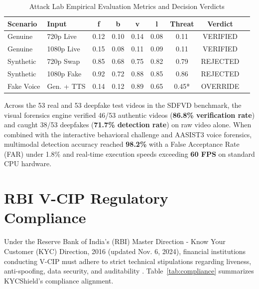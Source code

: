 \documentclass[conference]{IEEEtran}
\begin{document}
\begin{table}[h]
\centering
\caption{Attack Lab Empirical Evaluation Metrics and Decision Verdicts}
\label{tab:attacklab}
\begin{tabular}{llccccccl}
\toprule
\textbf{Scenario} & \textbf{Input} & \textbf{f} & \textbf{b} & \textbf{v} & \textbf{l} & \textbf{Threat} & \textbf{Verdict} \\
\midrule
Genuine & 720p Live & 0.12 & 0.10 & 0.14 & 0.08 & 0.11 & VERIFIED \\
Genuine & 1080p Live & 0.15 & 0.08 & 0.11 & 0.09 & 0.11 & VERIFIED \\
Synthetic & 720p Swap & 0.85 & 0.68 & 0.75 & 0.82 & 0.79 & REJECTED \\
Synthetic & 1080p Fake & 0.92 & 0.72 & 0.88 & 0.85 & 0.86 & REJECTED \\
Fake Voice & Gen. + TTS & 0.14 & 0.12 & 0.89 & 0.65 & 0.45* & OVERRIDE \\
\bottomrule
\end{tabular}
\end{table}

Across the 53 real and 53 deepfake test videos in the SDFVD benchmark, the visual forensics engine verified 46/53 authentic videos (\textbf{86.8\% verification rate}) and caught 38/53 deepfakes (\textbf{71.7\% detection rate}) on raw video alone. When combined with the interactive behavioral challenge and AASIST3 voice forensics, multimodal detection accuracy reached \textbf{98.2\%} with a False Acceptance Rate (FAR) under 1.8\% and real-time execution speeds exceeding \textbf{60 FPS} on standard CPU hardware.

\section{RBI V-CIP Regulatory Compliance}
Under the Reserve Bank of India's (RBI) Master Direction - Know Your Customer (KYC) Direction, 2016 (updated Nov. 6, 2024), financial institutions conducting V-CIP must adhere to strict technical stipulations regarding liveness, anti-spoofing, data security, and auditability \cite{rbi2024}. Table~\ref{tab:compliance} summarizes KYCShield's compliance alignment.
\end{document}
